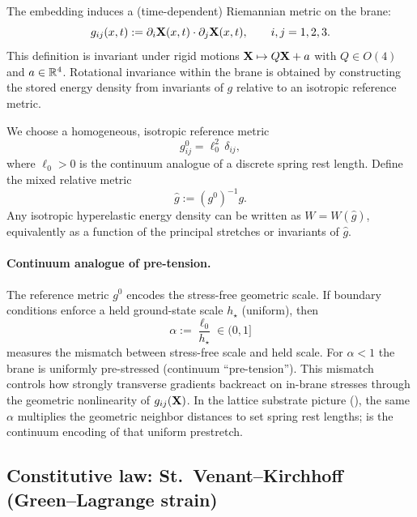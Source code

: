 The embedding induces a (time-dependent) Riemannian metric on the brane:
\begin{equation}
  g_{ij}(x,t) := \partial_i \mathbf{X}(x,t)\cdot \partial_j \mathbf{X}(x,t),
  \qquad i,j=1,2,3.
  \label{eq:induced-metric}
\end{equation}
This definition is invariant under rigid motions $\mathbf{X}\mapsto Q\mathbf{X}+a$ with $Q\in O(4)$ and $a\in\mathbb{R}^4$.
Rotational invariance within the brane is obtained by constructing the stored energy density from invariants of $g$
relative to an isotropic reference metric.

We choose a homogeneous, isotropic reference metric
\begin{equation}
  g^0_{ij}=\ell_0^2\,\delta_{ij},
  \label{eq:reference-metric}
\end{equation}
where $\ell_0>0$ is the continuum analogue of a discrete spring rest length.
Define the mixed relative metric
\begin{equation}
  \widehat g := (g^0)^{-1}g.
  \label{eq:relative-metric}
\end{equation}
Any isotropic hyperelastic energy density can be written as $W=W(\widehat g)$, equivalently as a function of the
principal stretches or invariants of $\widehat g$.

\paragraph{Continuum analogue of pre-tension.}
The reference metric $g^0$ encodes the stress-free geometric scale.
If boundary conditions enforce a held ground-state scale $h_\star$ (uniform), then
\begin{equation}
  \alpha:=\frac{\ell_0}{h_\star}\in(0,1]
  \label{eq:alpha-def}
\end{equation}
measures the mismatch between stress-free scale and held scale.
For $\alpha<1$ the brane is uniformly pre-stressed (continuum ``pre-tension''). This mismatch controls how strongly
transverse gradients backreact on in-brane stresses through the geometric nonlinearity of $g_{ij}(\mathbf{X})$.
In the lattice substrate picture (), the same $\alpha$ multiplies the geometric
neighbor distances to set spring rest lengths;  is the continuum encoding of that uniform prestretch.

\subsection{Constitutive law: St.\ Venant--Kirchhoff (Green--Lagrange strain)}


